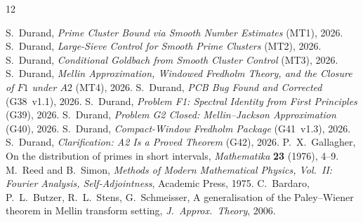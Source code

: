 \documentclass[11pt,a4paper]{article}
\begin{document}
\begin{thebibliography}{12}

 S.~Durand, \emph{Prime Cluster Bound via Smooth Number Estimates} (MT1), 2026.
 S.~Durand, \emph{Large-Sieve Control for Smooth Prime Clusters} (MT2), 2026.
 S.~Durand, \emph{Conditional Goldbach from Smooth Cluster Control} (MT3), 2026.
 S.~Durand, \emph{Mellin Approximation, Windowed Fredholm Theory, and the Closure of $F1$ under $A2$} (MT4), 2026.
 S.~Durand, \emph{PCB Bug Found and Corrected} (G38~v1.1), 2026.
 S.~Durand, \emph{Problem F1: Spectral Identity from First Principles} (G39), 2026.
 S.~Durand, \emph{Problem G2 Closed: Mellin--Jackson Approximation} (G40), 2026.
 S.~Durand, \emph{Compact-Window Fredholm Package} (G41~v1.3), 2026.
 S.~Durand, \emph{Clarification: A2 Is a Proved Theorem} (G42), 2026.
 P.~X.~Gallagher, On the distribution of primes in short intervals, \emph{Mathematika} \textbf{23} (1976), 4--9.
 M.~Reed and B.~Simon, \emph{Methods of Modern Mathematical Physics, Vol.~II: Fourier Analysis, Self-Adjointness}, Academic Press, 1975.
 C.~Bardaro, P.~L.~Butzer, R.~L.~Stens, G.~Schmeisser, A generalisation of the Paley--Wiener theorem in Mellin transform setting, \emph{J.~Approx.~Theory}, 2006.

\end{thebibliography}
\end{document}
